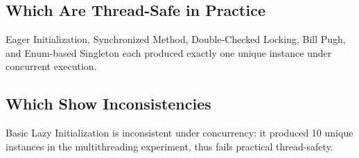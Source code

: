 \documentclass[12pt,a4paper]{article}
\begin{document}
\subsection*{Which Are Thread-Safe in Practice}
Eager Initialization, Synchronized Method, Double-Checked Locking, Bill Pugh, and Enum-based Singleton each produced exactly one unique instance under concurrent execution.

\subsection*{Which Show Inconsistencies}
Basic Lazy Initialization is inconsistent under concurrency: it produced 10 unique instances in the multithreading experiment, thus fails practical thread-safety.
\end{document}
